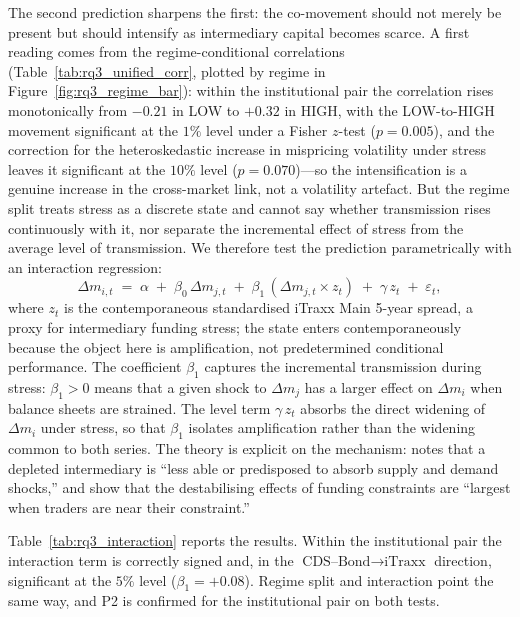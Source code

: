 The second prediction sharpens the first: the co-movement should not
merely be present but should intensify as intermediary capital becomes
scarce. A first reading comes from the regime-conditional correlations
(Table~\ref{tab:rq3_unified_corr}, plotted by regime in
Figure~\ref{fig:rq3_regime_bar}): within the institutional pair the
correlation rises monotonically from $-0.21$ in LOW to $+0.32$ in
HIGH, with the LOW-to-HIGH movement significant at
the $1\%$ level under a Fisher $z$-test ($p=0.005$), and the \citet{forbes2002no}
correction for the heteroskedastic increase in mispricing volatility
under stress leaves it significant at the $10\%$ level ($p=0.070$)---so the
intensification is a genuine increase in the cross-market link, not a
volatility artefact. But the regime split treats stress as a discrete
state and cannot say whether transmission rises continuously with it,
nor separate the incremental effect of stress from the average level
of transmission. We therefore test the prediction
parametrically with an interaction regression:
\begin{equation}\label{eq:interaction}
  \Delta m_{i,t} \;=\; \alpha \;+\; \beta_0\, \Delta m_{j,t}
  \;+\; \beta_1\, (\Delta m_{j,t} \times z_t)
  \;+\; \gamma\, z_t \;+\; \varepsilon_t,
\end{equation}
where $z_t$ is the contemporaneous standardised iTraxx Main 5-year
spread, a proxy for intermediary funding stress; the state enters
contemporaneously because the object here is amplification, not
predetermined conditional performance. The coefficient $\beta_1$ captures the
incremental transmission during stress: $\beta_1 > 0$ means that a
given shock to $\Delta m_j$ has a larger effect on $\Delta m_i$ when
balance sheets are strained. The level term $\gamma\,z_t$ absorbs the
direct widening of $\Delta m_i$ under stress, so that $\beta_1$
isolates amplification rather than the widening common to both series. The theory is explicit on the mechanism:
\citet{duffie2010presidential} notes that a depleted intermediary is
``less able or predisposed to absorb supply and demand shocks,'' and
\citet{brunnermeier2009market} show that the destabilising effects of
funding constraints are ``largest when traders are near their
constraint.''

Table~\ref{tab:rq3_interaction} reports the results. Within the
institutional pair the interaction term is correctly signed and, in
the $\textrm{CDS--Bond}\rightarrow\textrm{iTraxx}$ direction,
significant at the $5\%$ level ($\beta_1 = +0.08$). Regime split and
interaction point the same way, and P2 is confirmed for the
institutional pair on both tests.


